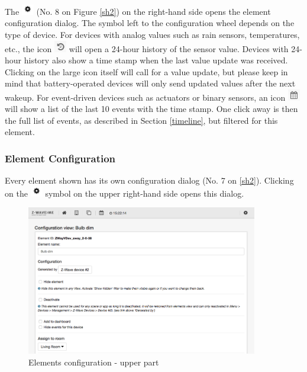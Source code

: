 The \includegraphics[width=0.04\textwidth]{pngs/wheel.png} (No. 8 on Figure \ref{sh2}) on 
the right-hand side opens the element configuration dialog. The symbol left to the configuration 
wheel depends on the type of device. For devices with analog values such as rain sensors, 
temperatures, etc., the icon \includegraphics[width=0.04\textwidth]{pngs/24hour.png} will 
open a 24-hour history of the sensor value. Devices 
with 24-hour history also show a time stamp when the last value update was received. 
Clicking on the large icon itself will call for a value update, but please keep in mind 
that battery-operated devices will only send updated values after the next wakeup.
For event-driven devices such as actuators or binary sensors, an icon 
\includegraphics[width=0.04\textwidth]{pngs/10events.png}
will show a list 
of the last 10 events with the time stamp. One click away is then the full list of 
events, as described in Section \ref{timeline}, but filtered for this element.

\subsubsection{Element Configuration}
\label{ElementConfiguration}

Every element shown has its own configuration dialog (No. 7 on \ref{sh2}). Clicking 
on the \includegraphics[width=0.04\textwidth]{pngs/wheel.png} symbol on the upper right-hand 
side opens this dialog.

\begin{figure}
\begin{center}
\includegraphics[width=0.9\textwidth]{pngs/cap4/sh5.png}
\caption{Elements configuration - upper part}
\label{sh5}
\end{center}
\end{figure}

